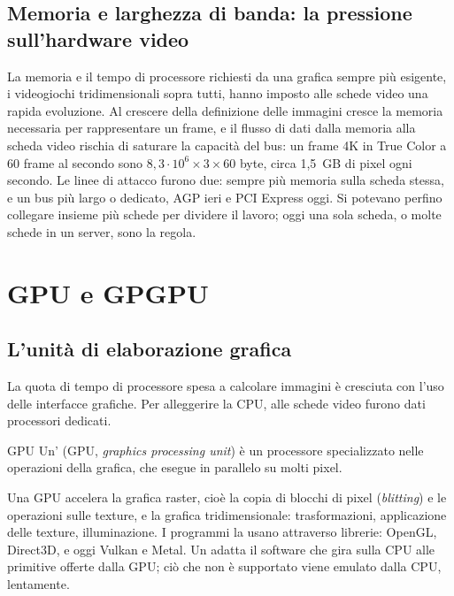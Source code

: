 \subsection{Memoria e larghezza di banda: la pressione sull'hardware video}

La memoria e il tempo di processore richiesti da una grafica sempre più
esigente, i videogiochi tridimensionali sopra tutti, hanno imposto alle schede
video una rapida evoluzione. Al crescere della definizione delle immagini
cresce la memoria necessaria per rappresentare un frame, e il flusso di dati
dalla memoria alla scheda video rischia di saturare la capacità del bus: un
frame 4K in True Color a 60 frame al secondo sono
$8,3\cdot 10^{6}\times 3\times 60$ byte, circa 1,5~GB di pixel ogni secondo.
Le linee di attacco furono due: sempre più memoria sulla scheda stessa, e un
bus più largo o dedicato, AGP ieri e PCI Express oggi. Si potevano perfino
collegare insieme più schede per dividere il lavoro; oggi una sola scheda, o
molte schede in un server, sono la regola.

\section{GPU e GPGPU}

\subsection{L'unità di elaborazione grafica}

La quota di tempo di processore spesa a calcolare immagini è cresciuta con
l'uso delle interfacce grafiche. Per alleggerire la CPU, alle schede video
furono dati processori dedicati.

\begin{definition}{GPU}
Un' (GPU, \emph{graphics processing unit})
è un processore specializzato nelle operazioni della grafica, che esegue in
parallelo su molti pixel.
\end{definition}

Una GPU accelera la grafica raster, cioè la copia di blocchi di pixel
(\emph{blitting}) e le operazioni sulle texture, e la grafica tridimensionale:
trasformazioni, applicazione delle texture, illuminazione. I programmi la
usano attraverso librerie: OpenGL, Direct3D, e oggi Vulkan e Metal. Un
 adatta il software che gira sulla CPU alle
primitive offerte dalla GPU; ciò che non è supportato viene emulato dalla CPU,
lentamente.

